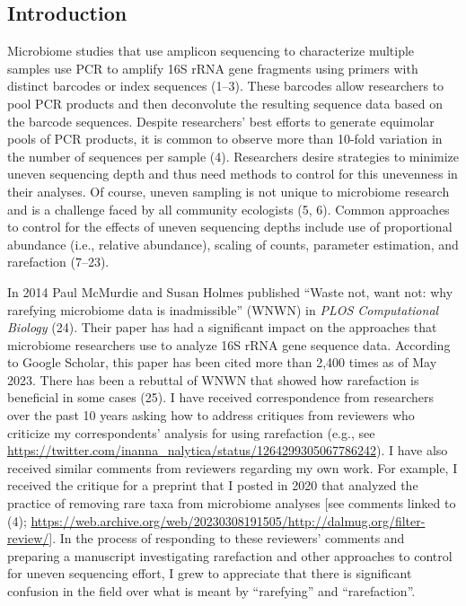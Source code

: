 \documentclass[
]{article}
\begin{document}
\newpage

\hypertarget{introduction}{%
\subsection{Introduction}\label{introduction}}

Microbiome studies that use amplicon sequencing to characterize multiple
samples use PCR to amplify 16S rRNA gene fragments using primers with
distinct barcodes or index sequences (1--3). These barcodes allow
researchers to pool PCR products and then deconvolute the resulting
sequence data based on the barcode sequences. Despite researchers' best
efforts to generate equimolar pools of PCR products, it is common to
observe more than 10-fold variation in the number of sequences per
sample (4). Researchers desire strategies to minimize uneven sequencing
depth and thus need methods to control for this unevenness in their
analyses. Of course, uneven sampling is not unique to microbiome
research and is a challenge faced by all community ecologists (5, 6).
Common approaches to control for the effects of uneven sequencing depths
include use of proportional abundance (i.e., relative abundance),
scaling of counts, parameter estimation, and rarefaction (7--23).

In 2014 Paul McMurdie and Susan Holmes published ``Waste not, want not:
why rarefying microbiome data is inadmissible'' (WNWN) in \emph{PLOS
Computational Biology} (24). Their paper has had a significant impact on
the approaches that microbiome researchers use to analyze 16S rRNA gene
sequence data. According to Google Scholar, this paper has been cited
more than 2,400 times as of May 2023. There has been a rebuttal of WNWN
that showed how rarefaction is beneficial in some cases (25). I have
received correspondence from researchers over the past 10 years asking
how to address critiques from reviewers who criticize my correspondents'
analysis for using rarefaction (e.g., see
\url{https://twitter.com/inanna_nalytica/status/1264299305067786242}). I
have also received similar comments from reviewers regarding my own
work. For example, I received the critique for a preprint that I posted
in 2020 that analyzed the practice of removing rare taxa from microbiome
analyses {[}see comments linked to (4);
\url{https://web.archive.org/web/20230308191505/http://dalmug.org/filter-review/}{]}.
In the process of responding to these reviewers' comments and preparing
a manuscript investigating rarefaction and other approaches to control
for uneven sequencing effort, I grew to appreciate that there is
significant confusion in the field over what is meant by ``rarefying''
and ``rarefaction''.
\end{document}
